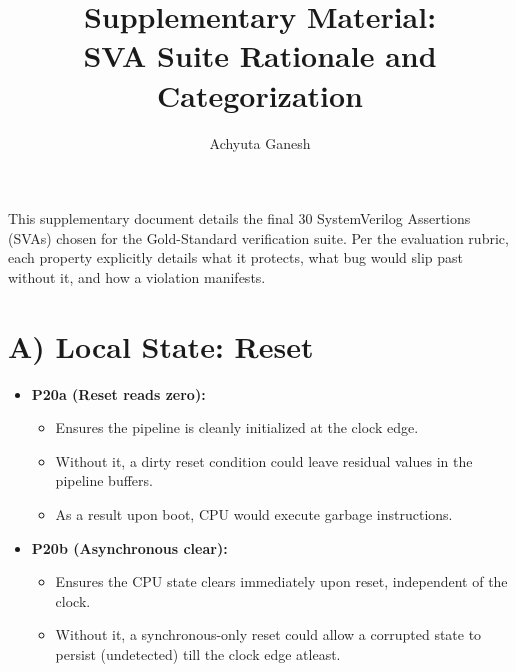 \documentclass[11pt]{article}
\title{\textbf{Supplementary Material:\\[4pt] \large SVA Suite Rationale and Categorization}}
\author{Achyuta Ganesh}
\date{}
\begin{document}
\maketitle

\noindent This supplementary document details the final 30 SystemVerilog Assertions (SVAs) chosen for the Gold-Standard verification suite. Per the evaluation rubric, each property explicitly details what it protects, what bug would slip past without it, and how a violation manifests.

\section*{A) Local State: Reset}
\begin{itemize}
    \item \textbf{P20a (Reset reads zero):} 
    \begin{itemize}
        \item Ensures the pipeline is cleanly initialized at the clock edge.
        \item Without it, a dirty reset condition could leave residual values in the pipeline buffers.
        \item As a result upon boot, CPU would execute garbage instructions.
    \end{itemize}
    
    \item \textbf{P20b (Asynchronous clear):} 
    \begin{itemize}
        \item Ensures the CPU state clears immediately upon reset, independent of the clock.
        \item Without it, a synchronous-only reset could allow a corrupted state to persist (undetected) till the clock edge atleast.
    \end{itemize}
\end{itemize}
\end{document}
